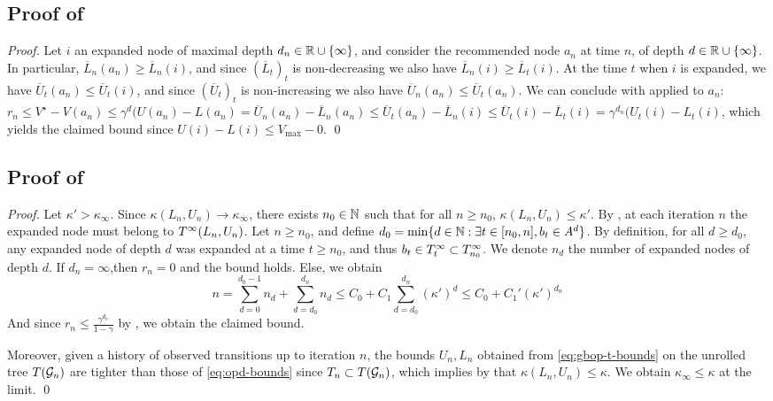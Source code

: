 \documentclass[runningheads]{llncs}
\begin{document}
\subsection{Proof of }
\begin{proof}
	Let $i$ an expanded node of maximal depth $d_n\in\mathbb{R}\cup\{\infty\}$, and consider the recommended node $a_n$ at time $n$, of depth $d\in\mathbb{R}\cup\{\infty\}$. In particular, $\overline{L}_n(a_n) \geq \overline{L}_n(i)$, and since $(\overline{L}_t)_t$ is non-decreasing we also have $\overline{L}_n(i) \geq \overline{L}_t(i)$. At the time $t$ when $i$ is expanded, we have $\overline{U}_t(a_n) \leq \overline{U}_t(i)$, and since $(\overline{U}_t)_t$ is non-increasing we also have $\overline{U}_n(a_n) \leq \overline{U}_t(a_n)$. We can conclude with  applied to $a_n$: $r_n \leq V^\star - V(a_n) \leq  \gamma^d(U(a_n)-L(a_n) = \overline{U}_n(a_n) - \overline{L}_n(a_n)  \leq \overline{U}_t(a_n) - \overline{L}_n(i) \leq \overline{U}_t(i) - \overline{L}_t(i) = \gamma^{d_n}(U_t(i) - L_t(i)$, which yields the claimed bound since $U(i) - L(i) \leq V_{\max}-0$.
\qed\end{proof}


\subsection{Proof of }

\begin{proof}
Let $\kappa'>\kappa_\infty$. Since $\kappa(L_n,U_n)\rightarrow\kappa_\infty$, there exists $n_0\in\mathbb{N}$ such that for all $n\geq n_0$, $\kappa(L_n,U_n) \leq \kappa'$.
By , at each iteration $n$ the expanded node must belong to $T^\infty(L_n,U_n)$.
Let $n\geq n_0$, and define $d_0 = \min\{d\in\mathbb{N}: \exists t \in[n_0,n], b_t\in A^d \}$. By definition, for all $d\geq d_0$, any expanded node of depth $d$ was expanded at a time $t\geq n_0$, and thus $b_t\in T^\infty_t \subset T^\infty_{n_0}$. We denote $n_d$ the number of expanded nodes of depth $d$. If $d_n=\infty$,then $r_n = 0$ and the bound holds. Else, we obtain
\[
n = \sum_{d=0}^{d_0-1}n_d + \sum_{d=d_0}^{d_n} n_d \leq  C_0 + C_1\sum_{d=d_0}^{d_n} (\kappa')^d \leq C_0 + C_1' (\kappa')^{d_n}
\]
And since $r_n \leq \frac{\gamma^{d_n}}{1-\gamma}$ by , we obtain the claimed bound.

Moreover, given a history of observed transitions up to iteration $n$, the bounds $U_n, L_n$ obtained from \eqref{eq:gbop-t-bounds} on the unrolled tree $T(\mathcal{G}_n)$ are tighter than those of \eqref{eq:opd-bounds} since $T_n\subset T(\mathcal{G}_n)$, which implies by  that $\kappa(L_n, U_n) \leq \kappa$. We obtain $\kappa_\infty \leq \kappa$ at the limit. 
\qed\end{proof}
\end{document}
